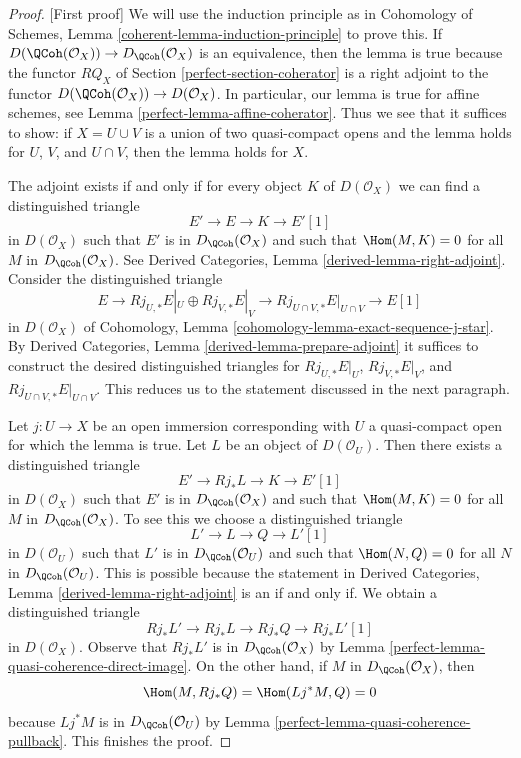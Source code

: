 \begin{proof}
[First proof]
We will use the induction principle as in
Cohomology of Schemes, Lemma \ref{coherent-lemma-induction-principle}
to prove this. If $D(\QCoh(\mathcal{O}_X)) \to D_\QCoh(\mathcal{O}_X)$
is an equivalence, then the lemma is true because the functor
$RQ_X$ of Section \ref{perfect-section-coherator} is a right adjoint to the functor
$D(\QCoh(\mathcal{O}_X)) \to D(\mathcal{O}_X)$.
In particular, our lemma is true for affine schemes, see
Lemma \ref{perfect-lemma-affine-coherator}.
Thus we see that it suffices to show: if $X = U \cup V$
is a union of two quasi-compact opens and the
lemma holds for $U$, $V$, and $U \cap V$, then the lemma holds for $X$.

\medskip\noindent
The adjoint exists if and only if for every object $K$ of
$D(\mathcal{O}_X)$ we can find a distinguished triangle
$$
E' \to E \to K \to E'[1]
$$
in $D(\mathcal{O}_X)$
such that $E'$ is in $D_\QCoh(\mathcal{O}_X)$ and such that
$\Hom(M, K) = 0$ for all $M$ in $D_\QCoh(\mathcal{O}_X)$. See
Derived Categories, Lemma \ref{derived-lemma-right-adjoint}.
Consider the distinguished triangle
$$
E \to Rj_{U, *}E|_U \oplus Rj_{V, *}E|_V \to
Rj_{U \cap V, *}E|_{U \cap V} \to E[1]
$$
in $D(\mathcal{O}_X)$ of
Cohomology, Lemma \ref{cohomology-lemma-exact-sequence-j-star}.
By Derived Categories, Lemma \ref{derived-lemma-prepare-adjoint}
it suffices to construct the desired distinguished triangles
for $Rj_{U, *}E|_U$, $Rj_{V, *}E|_V$, and
$Rj_{U \cap V, *}E|_{U \cap V}$. This reduces us to the statement
discussed in the next paragraph.

\medskip\noindent
Let $j : U \to X$ be an open immersion corresponding with $U$ a quasi-compact
open for which the lemma is true. Let $L$ be an object of $D(\mathcal{O}_U)$.
Then there exists a distinguished triangle
$$
E' \to Rj_*L \to K \to E'[1]
$$
in $D(\mathcal{O}_X)$
such that $E'$ is in $D_\QCoh(\mathcal{O}_X)$ and such that
$\Hom(M, K) = 0$ for all $M$ in $D_\QCoh(\mathcal{O}_X)$.
To see this we choose a distinguished triangle
$$
L' \to L \to Q \to L'[1]
$$
in $D(\mathcal{O}_U)$ such that $L'$ is in $D_\QCoh(\mathcal{O}_U)$
and such that $\Hom(N, Q) = 0$ for all $N$ in $D_\QCoh(\mathcal{O}_U)$.
This is possible because the statement in
Derived Categories, Lemma \ref{derived-lemma-right-adjoint}
is an if and only if.
We obtain a distinguished triangle
$$
Rj_*L' \to Rj_*L \to Rj_*Q \to Rj_*L'[1]
$$
in $D(\mathcal{O}_X)$. Observe that $Rj_*L'$ is in $D_\QCoh(\mathcal{O}_X)$
by Lemma \ref{perfect-lemma-quasi-coherence-direct-image}.
On the other hand, if $M$ in $D_\QCoh(\mathcal{O}_X)$, then
$$
\Hom(M, Rj_*Q) = \Hom(Lj^*M, Q) = 0
$$
because $Lj^*M$ is in $D_\QCoh(\mathcal{O}_U)$ by
Lemma \ref{perfect-lemma-quasi-coherence-pullback}.
This finishes the proof.
\end{proof}

